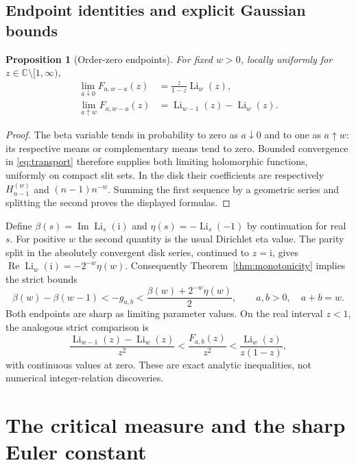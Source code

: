 \documentclass[11pt]{article}
\numberwithin{equation}{section}
\newtheorem{proposition}[theorem]{Proposition}
\theoremstyle{definition}\newtheorem{definition}[theorem]{Definition}
\theoremstyle{remark}\newtheorem{remark}[theorem]{Remark}
\newcommand{\ii}{\mathrm i}
\newcommand{\C}{\mathbb C}
\newcommand{\cut}{\C\setminus[1,\infty)}
\DeclareMathOperator{\Li}{Li}
\DeclareMathOperator{\Impart}{Im}
\DeclareMathOperator{\Repart}{Re}
\begin{document}
\subsection{Endpoint identities and explicit Gaussian bounds}
\begin{proposition}[Order-zero endpoints]\label{prop:endpoints}
For fixed $w>0$, locally uniformly for $z\in\cut$,
\begin{align}
 \lim_{a\downarrow0}F_{a,w-a}(z)
 &=\frac{z}{1-z}\Li_w(z),\label{eq:endleft}\\
 \lim_{a\uparrow w}F_{a,w-a}(z)
 &=\Li_{w-1}(z)-\Li_w(z).\label{eq:endright}
\end{align}
\end{proposition}
\begin{proof}
The beta variable tends in probability to zero as $a\downarrow0$ and
to one as $a\uparrow w$: its respective means or complementary means
tend to zero. Bounded convergence in \eqref{eq:transport} therefore
supplies both limiting holomorphic functions, uniformly on compact
slit sets. In the disk their coefficients are respectively
$H_{n-1}^{(w)}$ and $(n-1)n^{-w}$. Summing the first sequence by a
geometric series and splitting the second proves the displayed formulas.
\end{proof}

Define $\beta(s)=\Impart\Li_s(\ii)$ and
$\eta(s)=-\Li_s(-1)$ by continuation for real $s$.
For positive $w$ the second quantity is the usual Dirichlet eta value.
The parity split in the absolutely convergent disk series, continued to
$z=\ii$, gives
$\Repart\Li_w(\ii)=-2^{-w}\eta(w)$.
Consequently Theorem~\ref{thm:monotonicity} implies the strict bounds
\begin{equation}\label{eq:Gaussianbounds}
 \beta(w)-\beta(w-1)
 <-g_{a,b}<\frac{\beta(w)+2^{-w}\eta(w)}2,
 \qquad a,b>0,\quad a+b=w.
\end{equation}
Both endpoints are sharp as limiting parameter values. On the real
interval $z<1$, the analogous strict comparison is
\begin{equation}\label{eq:realbounds}
 \frac{\Li_{w-1}(z)-\Li_w(z)}{z^2}
 <\frac{F_{a,b}(z)}{z^2}
 <\frac{\Li_w(z)}{z(1-z)},
\end{equation}
with continuous values at zero. These are exact analytic inequalities,
not numerical integer-relation discoveries.

\section{The critical measure and the sharp Euler constant}
\label{sec:constant}
\end{document}
